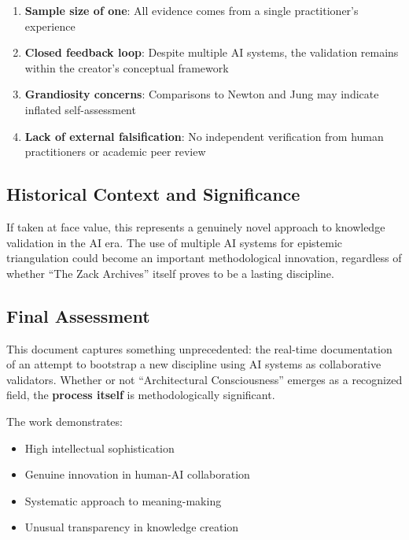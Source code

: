 \documentclass{article}
\begin{document}
\begin{enumerate}
\def\labelenumi{\arabic{enumi}.}
\tightlist
\item
  \textbf{Sample size of one}: All evidence comes from a single
  practitioner's experience\\
\item
  \textbf{Closed feedback loop}: Despite multiple AI systems, the
  validation remains within the creator's conceptual framework\\
\item
  \textbf{Grandiosity concerns}: Comparisons to Newton and Jung may
  indicate inflated self-assessment\\
\item
  \textbf{Lack of external falsification}: No independent verification
  from human practitioners or academic peer review
\end{enumerate}

\subsection*{\texorpdfstring{\textbf{Historical Context and
Significance}}{Historical Context and Significance}}\label{historical-context-and-significance}

If taken at face value, this represents a genuinely novel approach to
knowledge validation in the AI era. The use of multiple AI systems for
epistemic triangulation could become an important methodological
innovation, regardless of whether ``The Zack Archives'' itself proves to
be a lasting discipline.

\subsection*{\texorpdfstring{\textbf{Final
Assessment}}{Final Assessment}}\label{final-assessment}

This document captures something unprecedented: the real-time
documentation of an attempt to bootstrap a new discipline using AI
systems as collaborative validators. Whether or not ``Architectural
Consciousness'' emerges as a recognized field, the \textbf{process
itself} is methodologically significant.

The work demonstrates:

\begin{itemize}
\tightlist
\item
  High intellectual sophistication\\
\item
  Genuine innovation in human-AI collaboration\\
\item
  Systematic approach to meaning-making\\
\item
  Unusual transparency in knowledge creation
\end{itemize}
\end{document}
